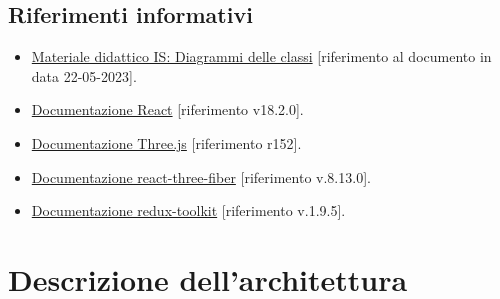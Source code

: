 \subsection{Riferimenti informativi}
\begin{itemize}
\item \href{https://www.math.unipd.it/~rcardin/swea/2023/Diagrammi%20delle%20Classi.pdf}{Materiale didattico IS: Diagrammi delle classi} [riferimento al documento in data 22-05-2023].
\item \href{https://legacy.reactjs.org/docs/getting-started.html}{Documentazione React} [riferimento v18.2.0].
\item \href{https://threejs.org/}{Documentazione Three.js} [riferimento r152].
\item \href{https://docs.pmnd.rs/react-three-fiber/getting-started/introduction}{Documentazione react-three-fiber} [riferimento v.8.13.0].
\item \href{https://redux-toolkit.js.org/introduction/getting-started}{Documentazione redux-toolkit} [riferimento v.1.9.5].
\end{itemize} 

\section{Descrizione dell'architettura}
